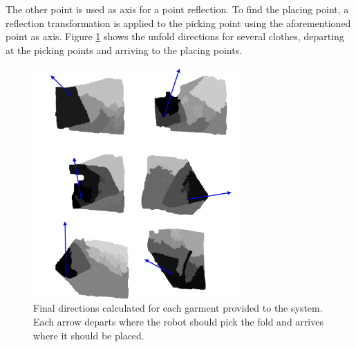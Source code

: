 The other point is used as axis for a point reflection. To find the placing point, a reflection transformation is applied to the picking point using the aforementioned point as axis. Figure \ref{fig:directions} shows the unfold directions for several clothes, departing at the picking points and arriving to the placing points.

\begin{figure}[thpb]
    \centering
    \includegraphics[width=0.7\textwidth]{figures/directions.pdf}
    \caption{Final directions calculated for each garment provided to the system. Each arrow departs where the robot should pick the fold and arrives where it should be placed.}
    \label{fig:directions}
\end{figure}